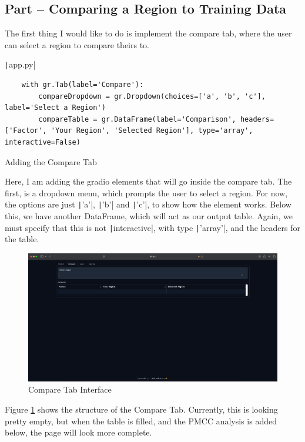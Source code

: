 \documentclass[12pt]{report}
\newcommand{\pil}[1]{\protect\texttt|#1|}
\begin{document}
\subsection{Part \theparts{} -- Comparing a Region to Training Data}

The first thing I would like to do is implement the compare tab, where the user can select a region to compare theirs to.

\begin{listing}[H]
\pil{app.py}
\begin{verbatim}
    with gr.Tab(label='Compare'):
        compareDropdown = gr.Dropdown(choices=['a', 'b', 'c'], label='Select a Region')
        compareTable = gr.DataFrame(label='Comparison', headers=['Factor', 'Your Region', 'Selected Region'], type='array', interactive=False)
\end{verbatim}
\caption{Adding the Compare Tab}\label{cs:compareTab}
\end{listing}

Here, I am adding the gradio elements that will go inside the compare tab. The first, is a dropdown menu, which prompts the user to select a region. For now, the options are just \pil{'a'}, \pil{'b'} and \pil{'c'}, to show how the element works. Below this, we have another DataFrame, which will act as our output table. Again, we must specify that this is not \pil{interactive}, with type \pil{'array'}, and the headers for the table.

\begin{figure}[H]
\centering
\includegraphics[width=14cm]{ss17.1.png}
\caption{Compare Tab Interface}\label{fig:ss17.1}
\end{figure}

Figure \ref{fig:ss17.1} shows the structure of the Compare Tab. Currently, this is looking pretty empty, but when the table is filled, and the PMCC analysis is added below, the page will look more complete.
\end{document}
